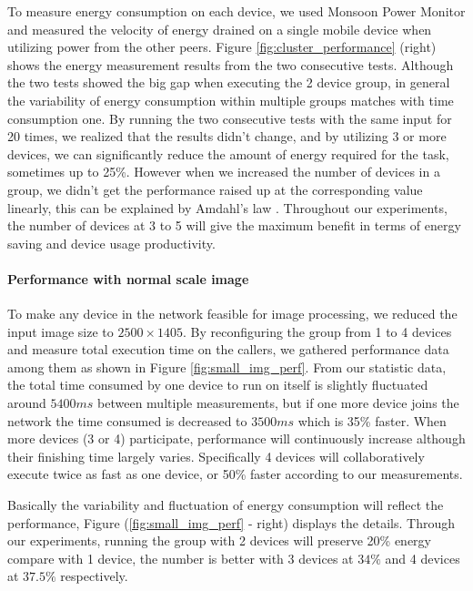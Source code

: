 \documentclass{sig-alternate}
\begin{document}
To measure energy consumption on each device, we used Monsoon Power Monitor \cite{moosoon} and measured the velocity of energy drained on a single mobile device when utilizing power from the other peers. Figure \ref{fig:cluster_performance} (right) shows the energy measurement results from the two consecutive tests. Although the two tests showed the big gap when executing the 2 device group, in general the variability of energy consumption within multiple groups matches with time consumption one. By running the two consecutive tests with the same input for 20 times, we realized that the results didn't change, and by utilizing 3 or more devices, we can significantly reduce the amount of energy required for the task, sometimes up to 25\%. However when we increased the number of devices in a group, we didn't get the performance raised up at the corresponding value linearly, this can be explained by Amdahl's law \cite{amdahl}. Throughout our experiments, the number of devices at 3 to 5 will give the maximum benefit in terms of energy saving and device usage productivity.

\paragraph{Performance with normal scale image}
To make any device in the network feasible for image processing, we reduced the input image size to $2500 \times 1405$. By reconfiguring the group from 1 to 4 devices and measure total execution time on the callers, we gathered performance data among them as shown in Figure \ref{fig:small_img_perf}. From our statistic data, the total time consumed by one device to run on itself is slightly fluctuated around $5400ms$ between multiple measurements, but if one more device joins the network the time consumed is decreased to $3500ms$ which is 35\% faster. When more devices (3 or 4) participate, performance will continuously increase although their finishing time largely varies. Specifically 4 devices will collaboratively execute twice as fast as one device, or 50\% faster according to our measurements.

Basically the variability and fluctuation of energy consumption will reflect the performance, Figure (\ref{fig:small_img_perf} - right) displays the details. Through our experiments, running the group with 2 devices will preserve 20\% energy compare with 1 device, the number is better with 3 devices at $34\%$ and 4 devices at $37.5\%$ respectively.

\end{document}
